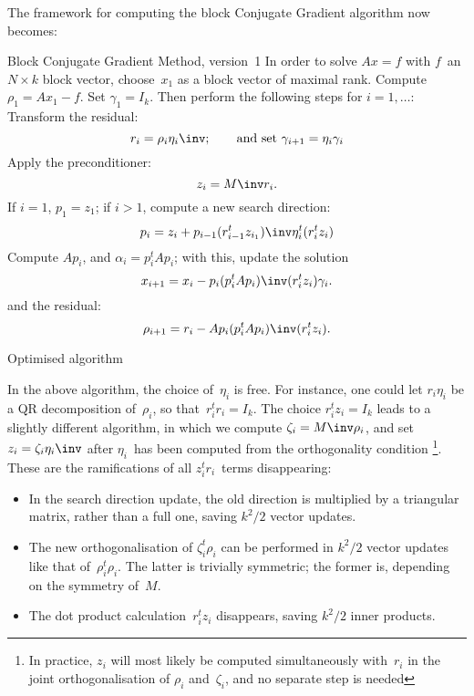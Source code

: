 \documentclass[11pt]{artikel3}
\begin{document}
\begin{Outline}
The framework for computing the block Conjugate Gradient algorithm now becomes:
\begin{algorithm}{Block Conjugate Gradient Method, version~1}
In order to solve $Ax=f$ with $f$~an $N\times k$ block vector,
choose~$x_1$ as a block vector of maximal rank. Compute $\rho_1=Ax_1-f$.
Set $\gamma_1=I_k$.
Then perform the following steps for $i=1,\ldots$:\\
Transform the residual:
\begin{equation} r_i=\rho_i\eta_i\inv;
    \qquad \hbox{and set $\gamma_{i+1}=\eta_i\gamma_i$}
    \end{equation}
Apply the preconditioner:
\begin{equation} z_i=M\inv r_i. \end{equation}
If $i=1$, $p_1=z_1$; if $i>1$, compute a new search direction:
\begin{equation} p_i=z_i+p_{i-1}(r_{i-1}^tz_{i_1})\inv\eta_i^t(r_i^tz_i) \end{equation}
Compute $Ap_i$, and $\alpha_i=p_i^tAp_i$; with this, update the solution
\begin{equation} x_{i+1}=x_i - p_i( p_i^tA p_i)\inv( r_i^tz_i)\gamma_i.
    \end{equation}
and the residual:
\begin{equation} \rho_{i+1}= r_i -A p_i( p_i^tA p_i)\inv( r_i^tz_i).
    \end{equation}
\end{algorithm}

 {Optimised algorithm}

In the above algorithm, the choice of~$\eta_i$ is free.
For instance, one could let $r_i\eta_i$ be a QR decomposition of~$\rho_i$,
so that~$r_i^tr_i=I_k$.
The choice $r_i^tz_i=I_k$ leads to a slightly different algorithm, in which
we compute $\zeta_i=M\inv\rho_i$, and set $z_i=\zeta_i\eta_i\inv$ after 
$\eta_i$~has been computed from the orthogonality condition%
\footnote{In practice, $z_i$ will most likely be computed simultaneously
with~$r_i$ in the joint orthogonalisation of $\rho_i$ and~$\zeta_i$,
and no separate step is needed}.
These are the ramifications of all $z_i^tr_i$~terms disappearing:
\begin{itemize}
\item In the search direction update, the old direction is multiplied
by a triangular matrix, rather than a full one, saving $k^2/2$ vector updates.
\item The new orthogonalisation of $\zeta_i^t\rho_i$ can be performed
in $k^2/2$ vector updates like that of~$\rho_i^t\rho_i$.
The latter is trivially symmetric; the former is, depending
on the symmetry of~$M$.
\item The dot product calculation~$r_i^tz_i$ disappears, saving $k^2/2$
inner products.
\end{itemize}


\end{Outline}
\end{document}
